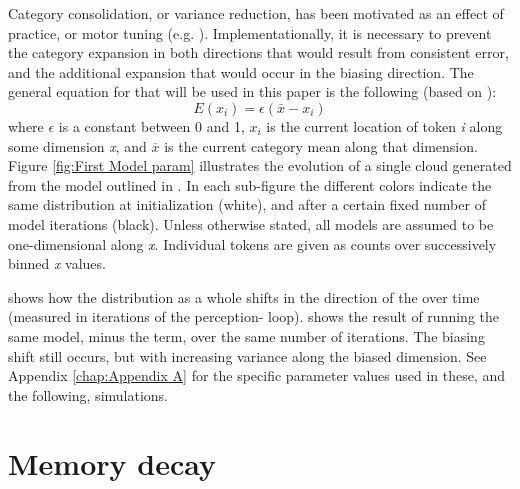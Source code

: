 Category consolidation, or variance reduction, has been motivated
as an effect of practice, or motor tuning (e.g. \citealp{saltzman1989dynamical}).
Implementationally, it is necessary to prevent the category expansion
in both directions that would result from consistent  error,
and the additional expansion that would occur in the biasing direction.
The general equation for  that will be used in this paper
is the following (based on \citealt{Pierrehumbert2000}):
\begin{equation}
E(x_{i})=\epsilon(\bar{x}-x_{i})\label{eq:Entrenchment}
\end{equation}
where $\epsilon$ is a constant between 0 and 1, $x_{i}$ is the current
location of token \emph{i} along some dimension \emph{x}, and $\overline{x}$
is the current category mean along that dimension. Figure \ref{fig:First Model param}
illustrates the evolution of a single  cloud generated from
the model outlined in . In
each sub-figure the different colors indicate the same distribution
at initialization (white), and after a certain fixed number of model
iterations (black). Unless otherwise stated, all models are assumed
to be one-dimensional along \emph{x}. Individual tokens are given
as counts over successively binned \emph{x} values. 

 shows how the distribution as
a whole shifts in the direction of the   over time (measured
in iterations of the perception- loop). 
shows the result of running the same model, minus the 
term, over the same number of iterations. The biasing shift still
occurs, but with increasing variance along the biased dimension. See
Appendix \ref{chap:Appendix A} for the specific parameter values
used in these, and the following, simulations. 

\section{Memory decay}


